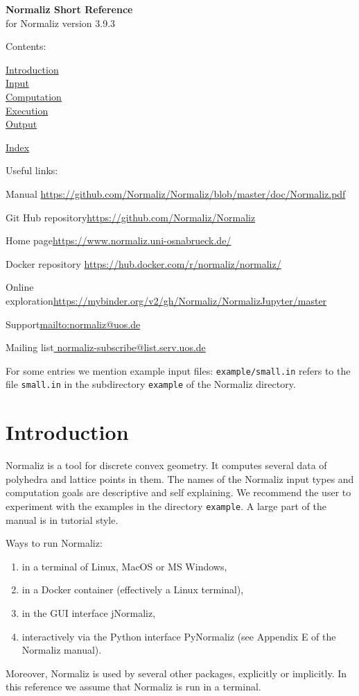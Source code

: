 \documentclass[12pt,a4paper]{scrartcl}
\theoremstyle{definition}
\def\ttt{\texttt}
\def\version{3.9.3}
\def\ContLine#1{\hyperref[#1]{\large #1}\\[6pt]}
\def\SectStart#1{\section{#1}\label{#1}\def\SectHead{#1}}
\def\example#1{\enspace\ttt{\color{blue}example/#1.in}}
\begin{document}
\vspace*{2cm}


\label{Top}
\begin{center}
\Large\textbf{Normaliz Short Reference}\\[12pt] for Normaliz version \version
\end{center}

Contents:\bigskip

\ContLine{Introduction}
\ContLine{Input}
\ContLine{Computation}
\ContLine{Execution}
\ContLine{Output}
\medskip

\ContLine{Index}

\bigskip

Useful links:\medskip

Manual \enspace \url{https://github.com/Normaliz/Normaliz/blob/master/doc/Normaliz.pdf}\smallskip

Git Hub repository\enspace \url{https://github.com/Normaliz/Normaliz}\smallskip

Home page\enspace \url{https://www.normaliz.uni-osnabrueck.de/}\smallskip

Docker repository \url{https://hub.docker.com/r/normaliz/normaliz/}\smallskip

Online exploration\enspace	\url{https://mybinder.org/v2/gh/Normaliz/NormalizJupyter/master}\smallskip

Support\enspace 	\url{mailto:normaliz@uos.de} \smallskip

Mailing list\enspace \url{ normaliz-subscribe@list.serv.uos.de}

\bigskip\bigskip

For some entries we mention example input files: \example{small} refers to the file \verb|small.in| in the subdirectory \verb|example| of the Normaliz directory.

\newpage

\SectStart{Introduction}

Normaliz is a tool for discrete convex geometry. It computes several data of polyhedra and lattice points in them. The names of the Normaliz input types and computation goals are descriptive and self explaining. We recommend the user to experiment with the examples in  the directory \verb|example|. A large part of the manual is in tutorial style.

Ways to run Normaliz:
\begin{enumerate}
\item in a terminal of Linux, MacOS or MS Windows,
\item in a Docker container (effectively a Linux terminal),
\item in the GUI interface jNormaliz,
\item interactively via the Python interface PyNormaliz (see Appendix E of the Normaliz manual).
\end{enumerate}
Moreover, Normaliz is used by several other packages, explicitly or implicitly. In this reference we assume that Normaliz is run in a terminal.
\end{document}
